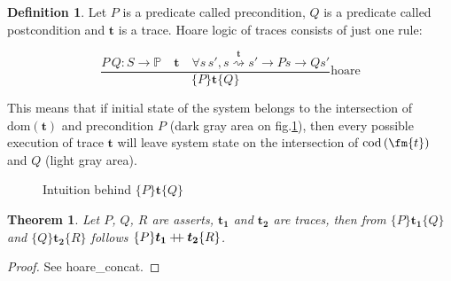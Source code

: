 \documentclass[10pt,letterpaper]{article}
\newcommand \prop{\mathds{P}}
\newcommand \dom[1]{\text{dom}\left(#1\right)}
\newcommand \cod[1]{\text{cod}\left(#1\right)}
\newcommand \chain[3]{\mathrel{#1\stackrel{#3}{\rightsquigarrow}#2}}
\newcommand \bm[1]{\boldsymbol{#1}}
\newcommand \mdoubleplus{\mathbin{+\mkern-6mu+}}
\newtheorem{theorem}{Theorem}
\theoremstyle{definition}
\newtheorem{definition}{Definition}
\begin{document}
\begin{definition}
  Let $P$ is a predicate called precondition, $Q$ is a predicate
  called postcondition and $\bm{t}$ is a trace. Hoare logic of traces
  consists of just one rule:

  \begin{equation}
    \frac{P\, Q: S \to \prop \quad \bm{t} \quad \forall s\,s', \chain{s}{s'}{\bm{t}} \to P s \to Q s'}
         {\{P\} \bm{t} \{Q\}}
    \text{hoare}
  \end{equation}

  This means that if initial state of the system belongs to the
  intersection of $\dom{\bm{t}}$ and precondition $P$ (dark gray area
  on fig.\ref{fig:hoare}), then every possible execution of trace
  $\bm{t}$ will leave system state on the intersection of
  $\cod{\fm{t}}$ and $Q$ (light gray area).

  \def\grdom{(0,0) circle (1.5cm)}
  \def\grcod{(0:5cm) circle (1.5cm)}
  \def\grpre{(1cm,2cm) circle (1.5cm)}
  \def\grpost{(6cm,2cm) circle (1.5cm)}

  \begin{figure}[h]
    \centering
    \caption{Intuition behind $\{P\}\bm{t}\{Q\}$}
    \label{fig:hoare}
  \end{figure}
\end{definition}

\begin{theorem}
  Let $P$, $Q$, $R$ are asserts, $\bm{t_1}$ and $\bm{t_2}$ are traces,
  then from $\{P\}\bm{t_1}\{Q\}$ and $\{Q\}\bm{t_2}\{R\}$ follows
  $\{P\}\bm{t_1} \mdoubleplus \bm{t_2} \{R\}$.
\end{theorem}
\begin{proof}
See \mbox{hoare\_concat}.
\end{proof}
\end{document}
